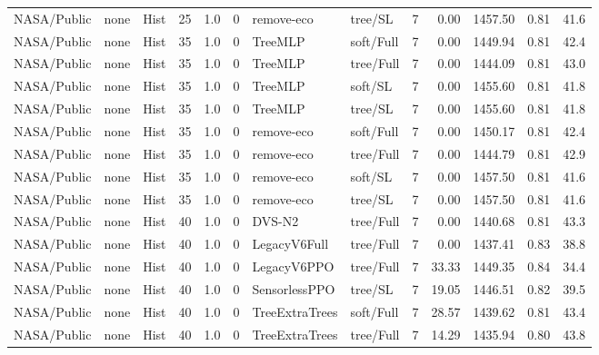 \documentclass[10pt,a4paper]{article}
\begin{document}
\begin{landscape}
\begin{longtable}{llllllllrrrrr}
NASA/Public & none & Hist & 25 & 1.0 & 0 & remove-eco & tree/SL & 7 & 0.00 & 1457.50 & 0.81 & 41.6 \\

NASA/Public & none & Hist & 35 & 1.0 & 0 & TreeMLP & soft/Full & 7 & 0.00 & 1449.94 & 0.81 & 42.4 \\

NASA/Public & none & Hist & 35 & 1.0 & 0 & TreeMLP & tree/Full & 7 & 0.00 & 1444.09 & 0.81 & 43.0 \\

NASA/Public & none & Hist & 35 & 1.0 & 0 & TreeMLP & soft/SL & 7 & 0.00 & 1455.60 & 0.81 & 41.8 \\

NASA/Public & none & Hist & 35 & 1.0 & 0 & TreeMLP & tree/SL & 7 & 0.00 & 1455.60 & 0.81 & 41.8 \\

NASA/Public & none & Hist & 35 & 1.0 & 0 & remove-eco & soft/Full & 7 & 0.00 & 1450.17 & 0.81 & 42.4 \\

NASA/Public & none & Hist & 35 & 1.0 & 0 & remove-eco & tree/Full & 7 & 0.00 & 1444.79 & 0.81 & 42.9 \\

NASA/Public & none & Hist & 35 & 1.0 & 0 & remove-eco & soft/SL & 7 & 0.00 & 1457.50 & 0.81 & 41.6 \\

NASA/Public & none & Hist & 35 & 1.0 & 0 & remove-eco & tree/SL & 7 & 0.00 & 1457.50 & 0.81 & 41.6 \\

NASA/Public & none & Hist & 40 & 1.0 & 0 & DVS-N2 & tree/Full & 7 & 0.00 & 1440.68 & 0.81 & 43.3 \\

NASA/Public & none & Hist & 40 & 1.0 & 0 & LegacyV6Full & tree/Full & 7 & 0.00 & 1437.41 & 0.83 & 38.8 \\

NASA/Public & none & Hist & 40 & 1.0 & 0 & LegacyV6PPO & tree/Full & 7 & 33.33 & 1449.35 & 0.84 & 34.4 \\

NASA/Public & none & Hist & 40 & 1.0 & 0 & SensorlessPPO & tree/SL & 7 & 19.05 & 1446.51 & 0.82 & 39.5 \\

NASA/Public & none & Hist & 40 & 1.0 & 0 & TreeExtraTrees & soft/Full & 7 & 28.57 & 1439.62 & 0.81 & 43.4 \\

NASA/Public & none & Hist & 40 & 1.0 & 0 & TreeExtraTrees & tree/Full & 7 & 14.29 & 1435.94 & 0.80 & 43.8 \\


\end{longtable}
\end{landscape}
\end{document}

